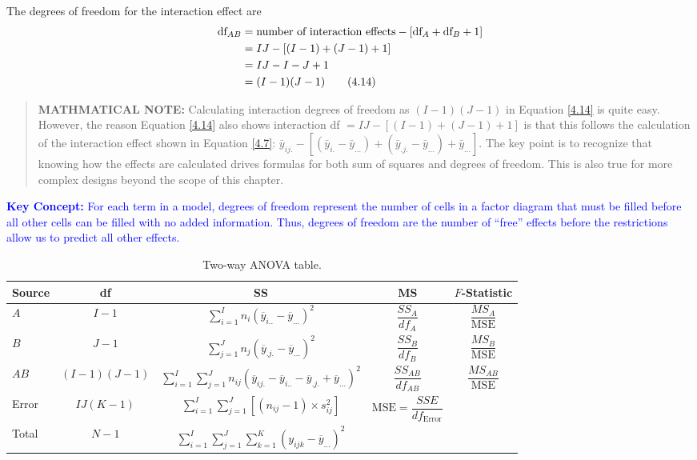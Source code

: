 \documentclass[
]{book}
\begin{document}
The degrees of freedom for the interaction effect are
\begin{align}\label{4.14}
\text{df}_{AB} &= \text{number of interaction effects} - [\text{df}_A + \text{df}_B + 1] \notag \\
&= IJ - [(I-1) + (J-1) + 1] \notag \\
&= IJ - I - J + 1 \notag \\
&= (I-1)(J-1)
\tag{4.14}
\end{align}

\begin{quote}
\textbf{MATHMATICAL NOTE:} Calculating interaction degrees of freedom as \((I-1)(J-1)\) in Equation \ref{4.14} is quite easy. However, the reason Equation \ref{4.14} also shows interaction df \(= IJ - [(I-1) + (J-1) + 1]\) is that this follows the calculation of the interaction effect shown in Equation \ref{4.7}: \(\bar{y}_{ij.} - [(\bar{y}_{i.} - \bar{y}_{...}) + (\bar{y}_{.j.} - \bar{y}_{...}) + \bar{y}_{...}]\). The key point is to recognize that knowing how the effects are calculated drives formulas for both sum of squares and degrees of freedom. This is also true for more complex designs beyond the scope of this chapter.
\end{quote}

\textbf{\textcolor{blue}{Key Concept:}}
\textcolor{blue}{For each term in a model, degrees of freedom represent the number of cells in a factor diagram that must be filled before all other cells can be filled with no added information. Thus, degrees of freedom are the number of “free” effects before the restrictions allow us to predict all other effects.}

\begin{table}[!h]
\centering
\caption{\label{tab:tab48}Two-way ANOVA table.}
\centering
\begin{tabular}[t]{lcccc}
\toprule
Source & df & SS & MS & $F$-Statistic\\
\midrule
$A$ & $I - 1$ & $\displaystyle\sum_{i=1}^{I} n_i (\overline{y}_{i..} - \overline{y}_{...})^2$ & $\dfrac{SS_A}{df_A}$ & $\dfrac{MS_A}{\text{MSE}}$\\
$B$ & $J - 1$ & $\displaystyle\sum_{j=1}^{J} n_j (\overline{y}_{.j.} - \overline{y}_{...})^2$ & $\dfrac{SS_B}{df_B}$ & $\dfrac{MS_B}{\text{MSE}}$\\
$AB$ & $(I-1)(J-1)$ & $\displaystyle\sum_{i=1}^{I}\sum_{j=1}^{J} n_{ij}(\overline{y}_{ij.} - \overline{y}_{i..} - \overline{y}_{.j.} + \overline{y}_{...})^2$ & $\dfrac{SS_{AB}}{df_{AB}}$ & $\dfrac{MS_{AB}}{\text{MSE}}$\\
Error & $IJ(K-1)$ & $\displaystyle\sum_{i=1}^I\sum_{j=1}^J [(n_{ij} - 1) \times s^2_{ij}]$ & $\text{MSE} = \dfrac{SSE}{df_{\text{Error}}}$ & \\
Total & $N-1$ & $\displaystyle\sum_{i=1}^I\sum_{j=1}^J\sum_{k=1}^K (y_{ijk} - \overline{y}_{...})^2$ &  & \\
\bottomrule
\end{tabular}
\end{table}
\end{document}
